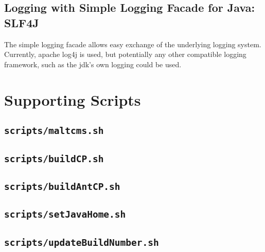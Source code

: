 \documentclass[a4paper,10pt]{article}
\begin{document}
\subsection{Logging with Simple Logging Facade for Java: SLF4J}
The simple logging facade allows easy exchange of the underlying logging system. Currently, apache log4j is used, but potentially any other compatible logging framework, such as the jdk's own logging could be used.
\section{Supporting Scripts}
\subsection{\texttt{scripts/maltcms.sh}}


\subsection{\texttt{scripts/buildCP.sh}}


\subsection{\texttt{scripts/buildAntCP.sh}}


\subsection{\texttt{scripts/setJavaHome.sh}}


\subsection{\texttt{scripts/updateBuildNumber.sh}}

\end{document}
